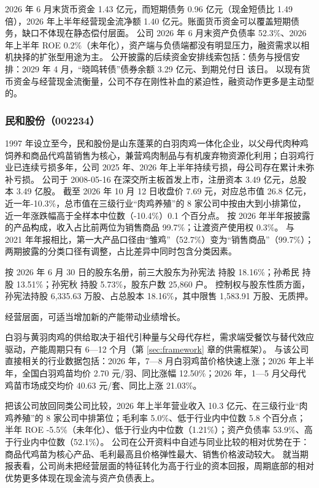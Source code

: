  2026 年 6 月末货币资金 1.43 亿元，而短期债务 0.96 亿元（现金短债比 1.49 倍），2026 年上半年经营现金流净额 1.40 亿元。账面货币资金可以覆盖短期债务，缺口不体现在静态偿付层面。 公司 2026 年 6 月末资产负债率 52.3\%、2026 年上半年 ROE 0.2\%（未年化），资产端与负债端都没有明显压力，融资需求以相机抉择的扩张型用途为主。 公开披露的后续资金安排线索包括：债务与授信安排：2029 年 4 月，“晓鸣转债”债券余额 3.29 亿元、到期兑付日 该日。 以现有货币资金与经营现金流衡量，公司不存在刚性补血的紧迫性，融资动作更多是主动型的。




\subsubsection{民和股份（002234）}
\label{co:002234}

 1997 年设立至今，民和股份是山东蓬莱的白羽肉鸡一体化企业，以父母代肉种鸡饲养和商品代鸡苗销售为核心，兼营鸡肉制品与有机废弃物资源化利用；白羽鸡行业已连续亏损多年，公司 2025 年、2026 年上半年持续亏损，母公司存在累计未弥补亏损。 公司于 2008-05-16 在深交所主板首发上市，注册资本 3.49 亿元，总股本 3.49 亿股。 截至 2026 年 10 月 12 日收盘价 7.69 元，对应总市值 26.8 亿元，近一年-10.3\%，总市值在三级行业“肉鸡养殖”的 8 家公司中按由大到小排第位，近一年涨跌幅高于全样本中位数（-10.4\%）0.1 个百分点。 按 2026 年半年报披露的产品构成，收入占比前两位为销售商品 99.7\%；让渡资产使用权 0.3\%。 与 2021 年年报相比，第一大产品口径由“雏鸡”（52.7\%）变为“销售商品”（99.7\%）；两期披露的分类口径有调整，占比差异中同时包含分类因素。

 按 2026 年 6 月 30 日的股东名册，前三大股东为孙宪法 持股 18.16\%；孙希民 持股 13.51\%；孙宪秋 持股 5.73\%，股东户数 25,860 户。 控制权与股东性质方面，孙宪法持股 6,335.63 万股、占总股本 18.16\%，其中限售 1,583.91 万股、无质押。

 经营层面，可适当增加新的产能带动业绩增长。

 白羽与黄羽肉鸡的供给取决于祖代引种量与父母代存栏，需求端受餐饮与替代效应驱动，产能周期只有 6---12 个月（第 \ref{sec:framework} 章的供需框架）。 与该公司直接相关的行业数据包括：2026 年，7—8 月白羽鸡苗价格快速上涨；2026 年上半年，全国白羽鸡苗均价 2.70 元/羽、同比涨幅 12.50\%；2026 年，1—5 月父母代鸡苗市场成交均价 40.63 元/套、同比上涨 21.03\%。

 把该公司放回同类公司比较，2026 年上半年营业收入 10.3 亿元、在三级行业“肉鸡养殖”的 8 家公司中排第位；毛利率 5.0\%、低于行业内中位数 5.8 个百分点；半年 ROE -5.5\%（未年化）、低于行业内中位数（1.21\%）；资产负债率 53.9\%、高于行业内中位数（52.1\%）。 公司在公开资料中自述与同业比较的相对优势在于：商品代鸡苗为核心产品、毛利最高且价格弹性最大、销售价格波动较大。 就当期报表看，公司尚未把经营层面的特征转化为高于行业的资本回报，周期底部的相对优势更多体现在现金流与资产负债表上。

